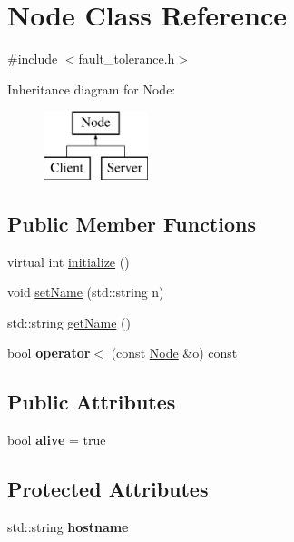 \hypertarget{classNode}{\section{Node Class Reference}
\label{classNode}
}


{\ttfamily \#include $<$fault\-\_\-tolerance.\-h$>$}

Inheritance diagram for Node\-:\begin{figure}[H]
\begin{center}
\leavevmode
\includegraphics[height=2.000000cm]{classNode}
\end{center}
\end{figure}
\subsection*{Public Member Functions}
\begin{DoxyCompactItemize}
\item 
virtual int \hyperlink{classNode_acfbc12d3b7d414fb12811041b04a1809}{initialize} ()
\item 
void \hyperlink{classNode_af79916b6bb2580b7cf9397bdeb172988}{set\-Name} (std\-::string n)
\item 
std\-::string \hyperlink{classNode_a3e5ac6b5881a3a9d82f3112953c1e546}{get\-Name} ()
\item 
\hypertarget{classNode_a821b0d4eb044c0ee3a61a3a1faadbe9f}{bool {\bfseries operator$<$} (const \hyperlink{classNode}{Node} \&o) const }\label{classNode_a821b0d4eb044c0ee3a61a3a1faadbe9f}

\end{DoxyCompactItemize}
\subsection*{Public Attributes}
\begin{DoxyCompactItemize}
\item 
\hypertarget{classNode_a00158aa52528c00b589d98ce6457dfed}{bool {\bfseries alive} = true}\label{classNode_a00158aa52528c00b589d98ce6457dfed}

\end{DoxyCompactItemize}
\subsection*{Protected Attributes}
\begin{DoxyCompactItemize}
\item 
\hypertarget{classNode_a9f5a57e15567a0b92cb8d25bcec7bd24}{std\-::string {\bfseries hostname}}\label{classNode_a9f5a57e15567a0b92cb8d25bcec7bd24}

\end{DoxyCompactItemize}


